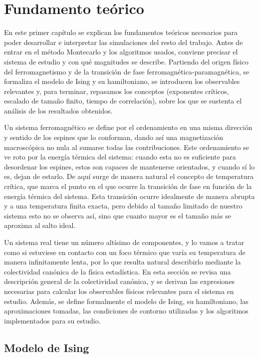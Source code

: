 \chapter{Fundamento teórico} \label{chap:teoria}

En este primer capítulo se explican los fundamentos teóricos necesarios para poder desarrollar e interpretar las simulaciones del resto del trabajo. Antes de entrar en el método Montecarlo y los algoritmos usados, conviene precisar el sistema de estudio y con qué magnitudes se describe. Partiendo del origen físico del ferromagnetismo y de la transición de fase ferromagnética-paramagnética, se formaliza el modelo de Ising y su hamiltoniano, se introducen los observables relevantes y, para terminar, repasamos los conceptos (exponentes críticos, escalado de tamaño finito, tiempo de correlación), sobre los que se sustenta el análisis de los resultados obtenidos.

Un sistema ferromagnético se define por el ordenamiento en una misma dirección y sentido de los espines que lo conforman, dando así una magnetización macroscópica no nula al sumarse todas las contribuciones. Este ordenamiento se ve roto por la energía térmica del sistema: cuando esta no es suficiente para desordenar los espines, estos son capaces de mantenerse orientados, y cuando sí lo es, dejan de estarlo. De aquí surge de manera natural el concepto de temperatura crítica, que marca el punto en el que ocurre la transición de fase en función de la energía térmica del sistema. Esta transición ocurre idealmente de manera abrupta y a una temperatura finita exacta, pero debido al tamaño limitado de nuestro sistema esto no se observa así, sino que cuanto mayor es el tamaño más se aproxima al salto ideal.

Un sistema real tiene un número altísimo de componentes, y lo vamos a tratar como si estuviese en contacto con un foco térmico que varía su temperatura de manera infinitamente lenta, por lo que resulta natural describirlo mediante la colectividad canónica de la física estadística. En esta sección se revisa una descripción general de la colectividad canónica, y se derivan las expresiones necesarias para calcular los observables físicos relevantes para el sistema en estudio. Además, se define formalmente el modelo de Ising, su hamiltoniano, las aproximaciones tomadas, las condiciones de contorno utilizadas y los algoritmos implementados para su estudio.

\section{Modelo de Ising}

